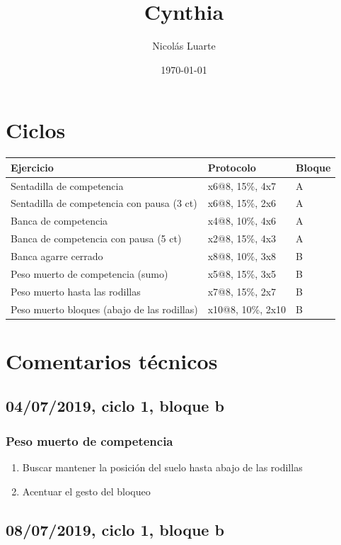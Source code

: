 \documentclass[11pt]{article}
\author{Nicolás Luarte}
\date{\today}
\title{Cynthia}
\begin{document}
\maketitle
\tableofcontents

\section{Ciclos}
\label{sec:org27feb22}
\begin{center}
\begin{tabular}{lll}
Ejercicio & Protocolo & Bloque\\
\hline
Sentadilla de competencia & x6@8, 15\%, 4x7 & A\\
Sentadilla de competencia con pausa (3 ct) & x6@8, 15\%, 2x6 & A\\
Banca de competencia & x4@8, 10\%, 4x6 & A\\
Banca de competencia con pausa (5 ct) & x2@8, 15\%, 4x3 & A\\
\hline
Banca agarre cerrado & x8@8, 10\%, 3x8 & B\\
Peso muerto de competencia (sumo) & x5@8, 15\%, 3x5 & B\\
Peso muerto hasta las rodillas & x7@8, 15\%, 2x7 & B\\
Peso muerto bloques (abajo de las rodillas) & x10@8, 10\%, 2x10 & B\\
\end{tabular}
\end{center}
\section{Comentarios técnicos}
\label{sec:orgcc07480}
\subsection{04/07/2019, ciclo 1, bloque b}
\label{sec:orge128ce5}
\subsubsection{Peso muerto de competencia}
\label{sec:orgceb1371}
\begin{enumerate}
\item Buscar mantener la posición del suelo hasta abajo de las rodillas
\item Acentuar el gesto del bloqueo
\end{enumerate}
\subsection{08/07/2019, ciclo 1, bloque b}
\label{sec:org04c3ea5}
\end{document}
